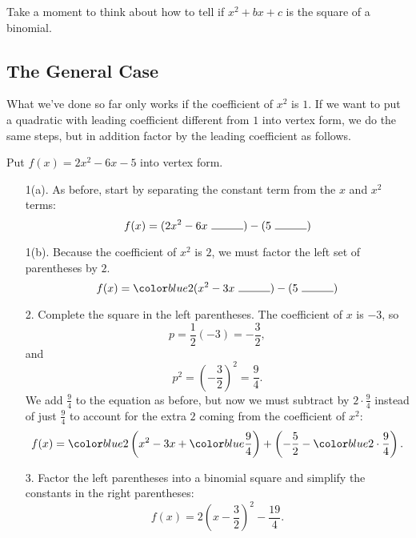 \documentclass{ximera}
\begin{document}
\begin{callout}
Take a moment to think about how to tell if $x^2 + bx + c$ is the square of a binomial.
\end{callout}
   
\subsection{The General Case}
   
What we've done so far only works if the coefficient of $x^2$ is $1$. If we want to put a quadratic with leading coefficient different from $1$ into vertex form, we do the same steps, but in addition factor by the leading coefficient as follows.

\begin{example} 
Put $f(x) = 2x^2 - 6x - 5$ into vertex form.
\begin{explanation}
\begin{enumerate}
    \item[1(a).] As before, start by separating the constant term from the $x$ and $x^2$ terms: 
    $$
    f(x) = (2x^2 - 6x\ \rule{1cm}{0.15mm}) - (5 \ \rule{1cm}{0.15mm})
    $$
    \item[1(b).] Because the coefficient of $x^2$ is $2$, we must factor the left set of parentheses by $2$.
    $$
    f(x) = \substitute{2} (x^2 - 3x\ \rule{1cm}{0.15mm}) - (5 \ \rule{1cm}{0.15mm})
    $$
    \item[2.] Complete the square in the left parentheses. The coefficient of $x$ is $-3$, so
    $$
        p = \frac{1}{2}(-3) = -\frac{3}{2},
    $$
    and
    $$
        p^2 = \left(-\frac{3}{2}\right)^2 = \frac{9}{4}.
    $$
    We add $\frac{9}{4}$ to the equation as before, but now we must subtract by $2 \cdot \frac{9}{4}$ instead of just $\frac{9}{4}$ to account for the extra $2$ coming from the coefficient of $x^2$:
    $$
        f(x) = \substitute{2}\left(x^2 - 3x +\substitute{\frac{9}{4}}\right) + \left(-\frac{5}{2} -\substitute{2 \cdot \frac{9}{4}}\right).
    $$
    \item[3.] Factor the left parentheses into a binomial square and simplify the constants in the right parentheses:
    $$
        f(x) =2 \left(x-\frac{3}{2}\right)^2 - \frac{19}{4}.
    $$
\end{enumerate}
\end{explanation}
\end{example}
\end{document}
